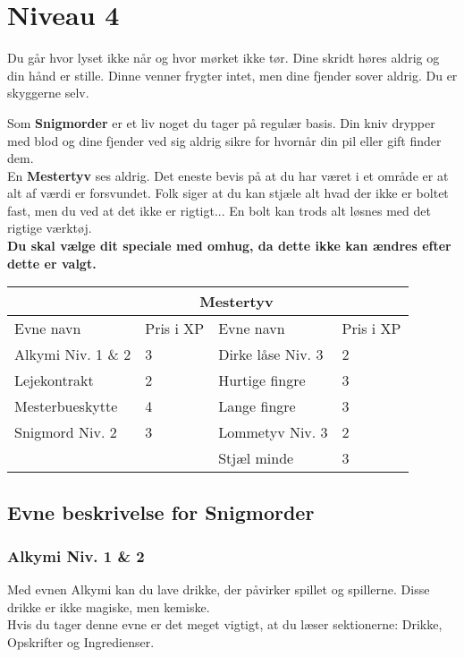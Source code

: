 \chapter{Niveau 4}

Du går hvor lyset ikke når og hvor mørket ikke tør. Dine skridt høres aldrig og din hånd er stille. Dinne venner frygter intet, men dine fjender sover aldrig. Du er skyggerne selv.


Som \textbf{Snigmorder} er et liv noget du tager på regulær basis. Din kniv drypper med blod og dine fjender ved sig aldrig sikre for hvornår din pil eller gift finder dem.\\

En \textbf{Mestertyv} ses aldrig. Det eneste bevis på at du har været i et område er at alt af værdi er forsvundet. Folk siger at du kan stjæle alt hvad der ikke er boltet fast, men du ved at det ikke er rigtigt... En bolt kan trods alt løsnes med det rigtige værktøj.\\

\textbf{Du skal vælge dit speciale med omhug, da dette ikke kan ændres efter dette er valgt.}\\

\begin{tabular}{|p{}|p{}|p{}|p{}|}
\hline
\rowcolor{cerulean!80}
 \multicolumn{2}{|c|}{  Snigmorder } & \multicolumn{2}{|c|}{ Mestertyv }\\
\hline
\rowcolor{cerulean!40}
    Evne navn & Pris i XP & Evne navn & Pris i XP\\ \hline
    Alkymi Niv. 1 \& 2 & 3 & Dirke låse Niv. 3 & 2 \\ \hline
    Lejekontrakt & 2 & Hurtige fingre & 3\\\hline
    Mesterbueskytte & 4 & Lange fingre & 3\\\hline
    Snigmord Niv. 2 & 3 & Lommetyv Niv. 3 & 2\\\hline
    &&Stjæl minde & 3\\
\hline
\end{tabular}

\section{Evne beskrivelse for Snigmorder}

\subsection{Alkymi Niv. 1 \& 2}
Med evnen Alkymi kan du lave drikke, der påvirker spillet og spillerne. Disse drikke er ikke magiske, men kemiske.\\
Hvis du tager denne evne er det meget vigtigt, at du læser sektionerne: Drikke, Opskrifter og Ingredienser.


